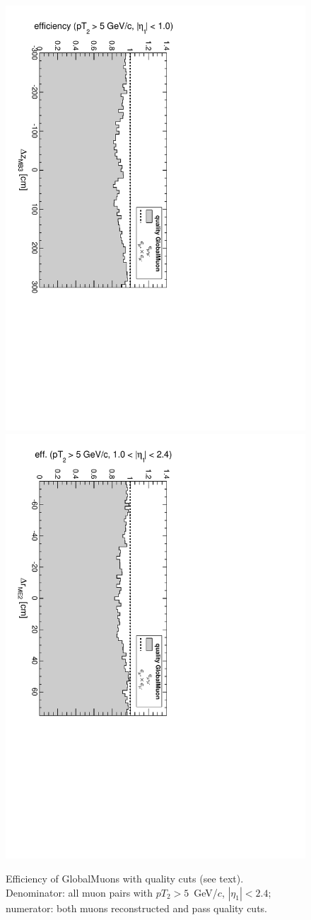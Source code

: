 \documentclass[12pt]{article}
\begin{document}
\begin{figure}
\includegraphics[height=0.5\linewidth, angle=90]{fig/acceptance8_plot/vsmb3dz_PlainGlobalMuon.pdf}
\includegraphics[height=0.5\linewidth, angle=90]{fig/acceptance8_plot/vsme2dr_PlainGlobalMuon.pdf}

\caption{Efficiency of GlobalMuons with quality cuts (see text).  Denominator: all muon pairs with $pT_2 > 5$~GeV/$c$, $|\eta_1| < 2.4$; numerator: both muons reconstructed and pass quality cuts. \label{fig:efficiencies_PlainGlobalMuon}}
\end{figure}
\end{document}
